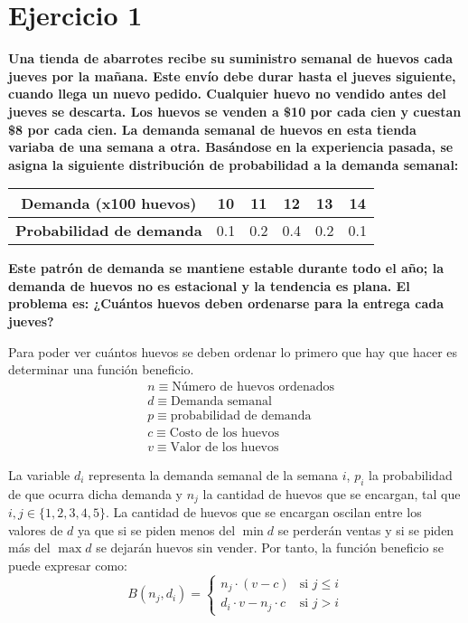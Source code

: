 \documentclass[12pt, letterpaper]{article}
\title{\doctitle}
\author{Juan Luis Serradilla Tormos}
\date{\monthname[\month] de \the\year}
\begin{document}
\pagestyle{fancy}

\maketitle

\newpage
\tableofcontents

\newpage
\section{Ejercicio 1}
\textbf{Una tienda de abarrotes recibe su suministro semanal de
huevos cada jueves por la mañana. Este envío debe durar hasta el jueves
siguiente, cuando llega un nuevo pedido. Cualquier huevo no vendido antes
del jueves se descarta. Los huevos se venden a \$10 por cada cien y cuestan
\$8 por cada cien. La demanda semanal de huevos en esta tienda variaba de una
semana a otra. Basándose en la experiencia pasada, se asigna la siguiente
distribución de probabilidad a la demanda semanal:}
\begin{table}[h]
    \centering
    \begin{tabular}{cccccc}
        \toprule
        \textbf{Demanda (x100 huevos)} & 10 & 11 & 12 & 13 & 14 \\
        \midrule
        \textbf{Probabilidad de demanda} & 0.1 & 0.2 & 0.4 & 0.2 & 0.1 \\
        \bottomrule
    \end{tabular}
\end{table}
\textbf{Este patrón de demanda se mantiene estable durante todo el año; la
demanda de huevos no es estacional y la tendencia es plana. El problema
es: ¿Cuántos huevos deben ordenarse para la entrega cada jueves?}

Para poder ver cuántos huevos se deben ordenar lo primero que hay que hacer es determinar una función beneficio.
\begin{align*}
    & n \equiv \text{Número de huevos ordenados} \\ 
    & d \equiv \text{Demanda semanal} \\
    & p \equiv \text{probabilidad de demanda} \\
    & c \equiv \text{Costo de los huevos} \\
    & v \equiv \text{Valor de los huevos} 
\end{align*}

La variable $d_i$ representa la demanda semanal de la semana $i$, $p_i$ la probabilidad de que ocurra dicha demanda y $n_j$  la cantidad de huevos que se encargan, tal que $i,j \in \{1,2,3,4,5\}$. La cantidad de huevos que se encargan oscilan entre los valores de $d$ ya que si se piden menos del $\min{d}$ se perderán ventas y si se piden más del $\max{d}$ se dejarán huevos sin vender. Por tanto, la función beneficio se puede expresar como:
\[
    B(n_j,d_i) = \begin{cases}
        n_j \cdot (v - c) & \text{si } j \leq i \\
        d_i \cdot v - n_j \cdot c & \text{si } j > i
    \end{cases}
\]
\end{document}
